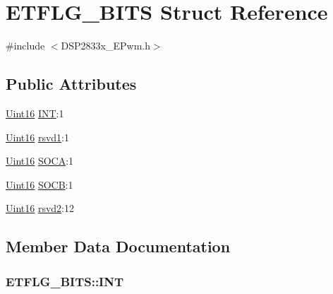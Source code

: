 \hypertarget{struct_e_t_f_l_g___b_i_t_s}{}\section{E\+T\+F\+L\+G\+\_\+\+B\+I\+T\+S Struct Reference}
\label{struct_e_t_f_l_g___b_i_t_s}


{\ttfamily \#include $<$D\+S\+P2833x\+\_\+\+E\+Pwm.\+h$>$}

\subsection*{Public Attributes}
\begin{DoxyCompactItemize}
\item 
\hyperlink{_d_s_p2833x___device_8h_a59a9f6be4562c327cbfb4f7e8e18f08b}{Uint16} \hyperlink{struct_e_t_f_l_g___b_i_t_s_aa752c6c8e6ec7d6bc03b7911dc5378c1}{I\+N\+T}\+:1
\item 
\hyperlink{_d_s_p2833x___device_8h_a59a9f6be4562c327cbfb4f7e8e18f08b}{Uint16} \hyperlink{struct_e_t_f_l_g___b_i_t_s_aebc56841c14c0d1f7fac4f397c930da9}{rsvd1}\+:1
\item 
\hyperlink{_d_s_p2833x___device_8h_a59a9f6be4562c327cbfb4f7e8e18f08b}{Uint16} \hyperlink{struct_e_t_f_l_g___b_i_t_s_a45fdebff1773a7f73574963b8da39dc1}{S\+O\+C\+A}\+:1
\item 
\hyperlink{_d_s_p2833x___device_8h_a59a9f6be4562c327cbfb4f7e8e18f08b}{Uint16} \hyperlink{struct_e_t_f_l_g___b_i_t_s_a6df3e745fc78633079eb9529c2f00b6d}{S\+O\+C\+B}\+:1
\item 
\hyperlink{_d_s_p2833x___device_8h_a59a9f6be4562c327cbfb4f7e8e18f08b}{Uint16} \hyperlink{struct_e_t_f_l_g___b_i_t_s_a621c11cb01aaa555f250930a51e7cf14}{rsvd2}\+:12
\end{DoxyCompactItemize}


\subsection{Member Data Documentation}
\hypertarget{struct_e_t_f_l_g___b_i_t_s_aa752c6c8e6ec7d6bc03b7911dc5378c1}{}
\subsubsection[{I\+N\+T}]{ E\+T\+F\+L\+G\+\_\+\+B\+I\+T\+S\+::\+I\+N\+T}\label{struct_e_t_f_l_g___b_i_t_s_aa752c6c8e6ec7d6bc03b7911dc5378c1}
\hypertarget{struct_e_t_f_l_g___b_i_t_s_aebc56841c14c0d1f7fac4f397c930da9}{}
